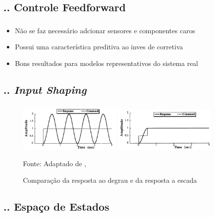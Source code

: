 \documentclass[aspectratio=169]{beamer}
\begin{document}
\subsection{\insertsectionnumber .\insertsubsectionnumber . Controle Feedforward}
\begin{frame}
  \frametitle{\insertsubsection}
  \begin{itemize}
    \item Não se faz necessário adcionar sensores e componentes caros
    \item Possui uma característica preditiva ao inves de corretiva
    \item Bons resultados para modelos representativos do sistema real
  \end{itemize}
\end{frame}

\subsection{\insertsectionnumber .\insertsubsectionnumber . \textit{Input Shaping}}
\begin{frame}
  \frametitle{\insertsubsection}
  \begin{figure}[H]
    \centering
    \caption{Comparação da resposta ao degrau e da resposta a escada}
    \includegraphics[width=0.45\textwidth]{inputshaperstepresponse1order}
    \includegraphics[width=0.45\textwidth]{inputshaperstarcasepresponse}

    {\footnotesize Fonte: Adaptado de \citeauthor{singhose97}, \citeyear{singhose97}}
    \label{fig:degr_vs_esc}
  \end{figure}
\end{frame}


\subsection{\insertsectionnumber .\insertsubsectionnumber . Espaço de Estados}
\end{document}
